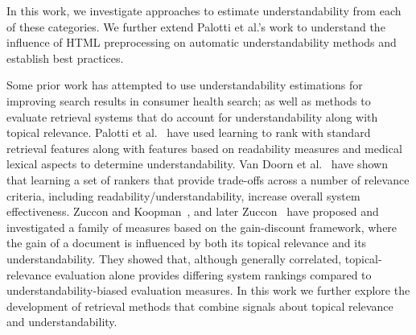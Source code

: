 In this work, we investigate approaches to estimate understandability from each of these categories. We further extend Palotti et al.'s work to understand the influence of HTML preprocessing on automatic understandability methods and establish best practices. 

Some prior work has attempted to use understandability estimations for improving search results in consumer health search; as well as methods to evaluate retrieval systems that do account for understandability along with topical relevance. Palotti et al.~\cite{palotti2016ranking} have used learning to rank with standard retrieval features along with features based on readability measures and medical lexical aspects to determine
understandability. Van Doorn et al.~\cite{van2016balancing} have shown that learning a set of rankers that provide trade-offs across a number of relevance criteria, including readability/understandability, increase overall system effectiveness.   
Zuccon and Koopman~\cite{zuccon14}, and later Zuccon~\cite{zuccon2016understandability} have proposed and investigated a family of measures based on the gain-discount framework, where the gain of a document is influenced by both its topical relevance and its understandability. They showed that, although generally correlated, topical-relevance evaluation alone provides differing system rankings compared to understandability-biased evaluation measures. 
In this work we further explore the development of retrieval methods that combine signals about topical relevance and understandability. 


